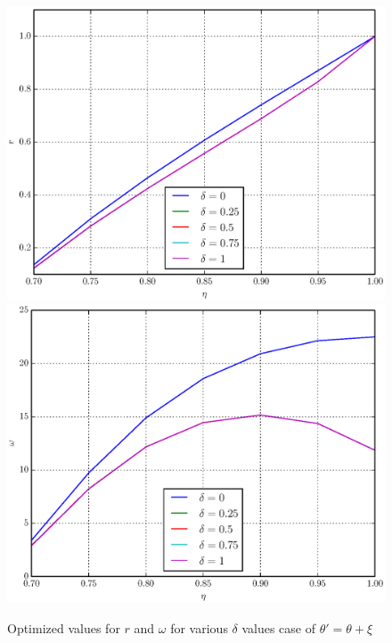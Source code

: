 \documentclass[11pt]{article}
\begin{document}
\begin{figure}[h]
\includegraphics[scale=0.7]{r_ang.eps}
\includegraphics[scale=0.7]{omega_ang.eps}
\caption{Optimized values for $r$ and $\omega$ for various $\delta$ values case of $\theta' = \theta + \xi$}
\label{fig:psi_ang}
\end{figure}
\end{document}
